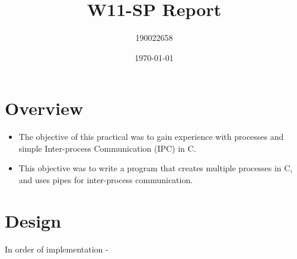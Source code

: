 \documentclass[11pt]{article}
\author{190022658}
\date{\today}
\title{W11-SP Report}
\begin{document}
\maketitle

\section{Overview}
\label{sec:org9e5d6f6}
\begin{itemize}
\item The objective of this practical was to gain experience with processes and simple Inter-process Communication (IPC) in C.\\
\item This objective was to write a program that creates multiple processes in C, and uses pipes for inter-process communication.\\
\end{itemize}


\section{Design}
\label{sec:org153d255}
In order of implementation -\\
\end{document}
